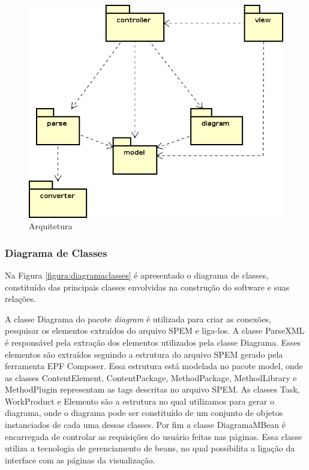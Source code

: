 \begin{figure}[!htb]
	\caption{Arquitetura} \label{figura:figuraArquitetura}
	\begin{center}
		\includegraphics[scale=0.5]{img/ferramenta_arquitetura}
	\end{center}
\end{figure}
\subsubsection{Diagrama de Classes}\label{subsection:classes}
Na Figura \ref{figura:diagramaclasses} é apresentado o diagrama de classes, constituído das principais classes envolvidas na construção do software e suas relações. 

A classe Diagrama do pacote \textit{diagram} é utilizada para criar as conexões, pesquisar os elementos extraídos do arquivo SPEM e liga-los. A classe ParseXML é responsável pela extração dos elementos utilizados pela classe Diagrama. Esses elementos são extraídos seguindo a estrutura do arquivo SPEM gerado pela ferramenta EPF Composer. Essa estrutura está modelada no pacote model, onde as classes ContentElement, ContentPackage, MethodPackage, MethodLibrary e MethodPlugin representam as tags descritas no arquivo SPEM.
As classes Task, WorkProduct e Elemento são a estrutura no qual utilizamos para gerar o diagrama, onde o diagrama pode ser constituído de um conjunto de objetos instanciados de cada uma dessas classes. Por fim a classe DiagramaMBean é encarregada de controlar as requisições do usuário feitas nas páginas. Essa classe utiliza a tecnologia de gerenciamento de beans, no qual possibilita a ligação da interface com as páginas da visualização.

